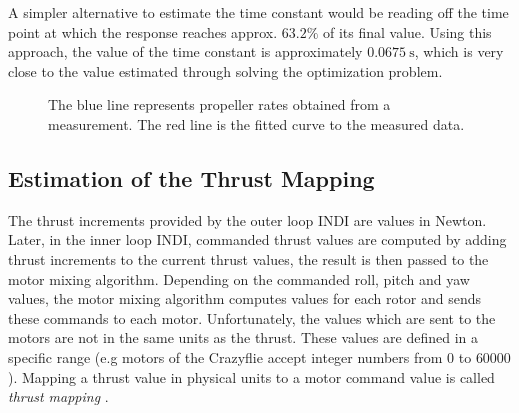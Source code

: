 \documentclass[11pt, a4paper, twoside]{report}
\begin{document}
A simpler alternative to estimate the time constant would be reading off the time point at which the response reaches approx. $63.2 \%$ of its final value. Using this approach, the value of the time constant is approximately $0.0675~\si{\second}$, which is very close to the value estimated through solving the optimization problem.

\begin{figure}[H]
	\centering 
	\captionsetup{justification=centering, singlelinecheck=off, font=bf, belowskip=-0.5cm}
	\caption[Fitting first order lag element to propeller rates measurement]{The blue line represents propeller rates obtained from a measurement. The red line is the fitted curve to the measured data. }
	\label{fig:actuator_dynamics_est}
\end{figure}

\subsection{Estimation of the Thrust Mapping} \label{subsec:thrust_mapping}

The thrust increments provided by the outer loop \acrshort{INDI} are values in  Newton. Later, in the inner loop \acrshort{INDI}, commanded thrust values are computed by adding thrust increments to the current thrust values, the result is then passed to the motor mixing algorithm. Depending on the commanded roll, pitch and yaw values, the motor mixing algorithm computes values for each rotor and sends these commands to each motor. Unfortunately, the values which are sent to the motors are not in the same units as the thrust. These values are defined in a specific range (e.g motors of the Crazyflie accept integer numbers from $0$ to $60000$). Mapping a thrust value in physical units to a motor command value is called \textit{thrust mapping} \cite{faessler}.
\end{document}
